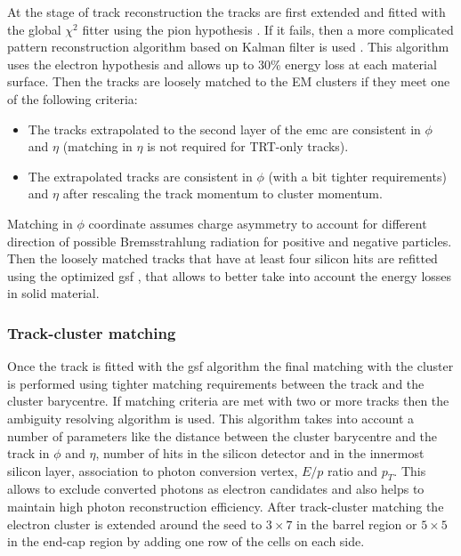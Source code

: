  	At the stage of track reconstruction the tracks are first extended and fitted with the global $\chi^2$ fitter using the pion hypothesis \cite{Cornelissen:2008zza}. If it fails, then a more complicated pattern reconstruction algorithm based on Kalman filter is used \cite{Cornelissen:1020106}. This algorithm uses the electron hypothesis and allows up to 30\% energy loss at each material surface. Then the tracks are loosely matched to the EM clusters if they meet one of the following criteria:
 	\begin{itemize}
 		\item The tracks extrapolated to the second layer of the \gls{emc} are consistent in $\phi$ and $\eta$ (matching in $\eta$ is not required for TRT-only tracks). 
 		\item The extrapolated tracks are consistent in $\phi$ (with a bit tighter requirements) and $\eta$ after rescaling the track momentum to cluster momentum.
 	\end{itemize}
  	Matching in $\phi$ coordinate assumes charge asymmetry to account for different direction of possible Bremsstrahlung radiation for positive and negative particles. Then the loosely matched tracks that have at least four silicon hits are refitted using the optimized \gls{gsf} \cite{GSF}, that allows to better take into account the energy losses in solid material.
  	
 	\subsubsection{Track-cluster matching}
 	Once the track is fitted with the \gls{gsf} algorithm the final matching with the cluster is performed using tighter matching requirements between the track and the cluster barycentre. If matching criteria are met with two or more tracks then the ambiguity resolving algorithm is used. This algorithm takes into account a number of parameters like the distance between the cluster barycentre and the track in $\phi$ and $\eta$, number of hits in the silicon detector and in the innermost silicon layer, association to photon conversion vertex, $E/p$ ratio and $p_T$. This allows to exclude converted photons as electron candidates and also helps to maintain high photon reconstruction efficiency. After track-cluster matching the electron cluster is extended around the seed to $3 \times 7$ in the barrel region or $5\times 5$ in the end-cap region by adding one row of the cells on each side. 
 	
